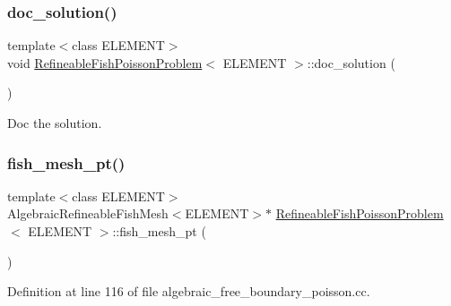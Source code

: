 \mbox{\label{classRefineableFishPoissonProblem_a6db25ff0bd3014aa531d9f0e8b385beb}} 
\subsubsection{\texorpdfstring{doc\+\_\+solution()}{doc\_solution()}\hspace{0.1cm}{\footnotesize\ttfamily [2/2]}}
{\footnotesize\ttfamily template$<$class E\+L\+E\+M\+E\+NT$>$ \\
void \hyperlink{classRefineableFishPoissonProblem}{Refineable\+Fish\+Poisson\+Problem}$<$ E\+L\+E\+M\+E\+NT $>$\+::doc\+\_\+solution (\begin{DoxyParamCaption}{ }\end{DoxyParamCaption})}



Doc the solution. 

\mbox{\label{classRefineableFishPoissonProblem_a6f25d5110e5262e66e2900da051567a6}} 
\subsubsection{\texorpdfstring{fish\+\_\+mesh\+\_\+pt()}{fish\_mesh\_pt()}\hspace{0.1cm}{\footnotesize\ttfamily [1/2]}}
{\footnotesize\ttfamily template$<$class E\+L\+E\+M\+E\+NT$>$ \\
Algebraic\+Refineable\+Fish\+Mesh$<$E\+L\+E\+M\+E\+NT$>$$\ast$ \hyperlink{classRefineableFishPoissonProblem}{Refineable\+Fish\+Poisson\+Problem}$<$ E\+L\+E\+M\+E\+NT $>$\+::fish\+\_\+mesh\+\_\+pt (\begin{DoxyParamCaption}{ }\end{DoxyParamCaption})\hspace{0.3cm}{\ttfamily [inline]}}



Definition at line 116 of file algebraic\+\_\+free\+\_\+boundary\+\_\+poisson.\+cc.



